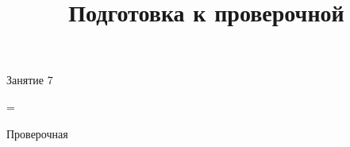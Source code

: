 \begin{class}[number=7]
	\title{Подготовка к проверочной}
	\begin{listofex}
		\item Занятие 7
	\end{listofex}
\end{class}

=%
\begin{exam}
	\begin{listofex}
		\item Проверочная
	\end{listofex}
\end{exam}
